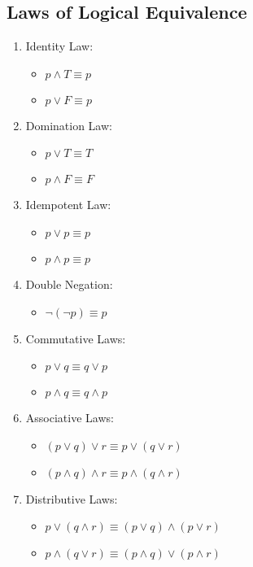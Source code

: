 \documentclass[letterpaper, 12pt]{math}
\begin{document}
\subsection*{Laws of Logical Equivalence}
\begin{enumerate}
  \item Identity Law:
  \begin{itemize}
    \item \( p \wedge T \equiv p \)
    \item \( p \vee F \equiv p \)
  \end{itemize}
  \item Domination Law:
  \begin{itemize}
    \item \( p \vee T \equiv T \)
    \item \( p \wedge F \equiv F \)
  \end{itemize}
  \item Idempotent Law:
  \begin{itemize}
    \item \( p \vee p \equiv p \)
    \item \( p \wedge p \equiv p \)
  \end{itemize}
  \item Double Negation:
  \begin{itemize}
    \item \( \neg{(\neg{p})} \equiv p \)
  \end{itemize}
  \item Commutative Laws:
  \begin{itemize}
    \item \( p \vee q \equiv q \vee p \)
    \item \( p \wedge q \equiv q \wedge p \)
  \end{itemize}
  \item Associative Laws:
  \begin{itemize}
    \item \( (p \vee q) \vee r \equiv p \vee (q \vee r) \)
    \item \( (p \wedge q) \wedge r \equiv p \wedge (q \wedge r) \)
  \end{itemize}
  \item Distributive Laws:
  \begin{itemize}
    \item \( p \vee (q \wedge r) \equiv (p \vee q) \wedge (p \vee r) \)
    \item \( p \wedge (q \vee r) \equiv (p \wedge q) \vee (p \wedge r) \)
  \end{itemize}

\end{enumerate}
\end{document}
